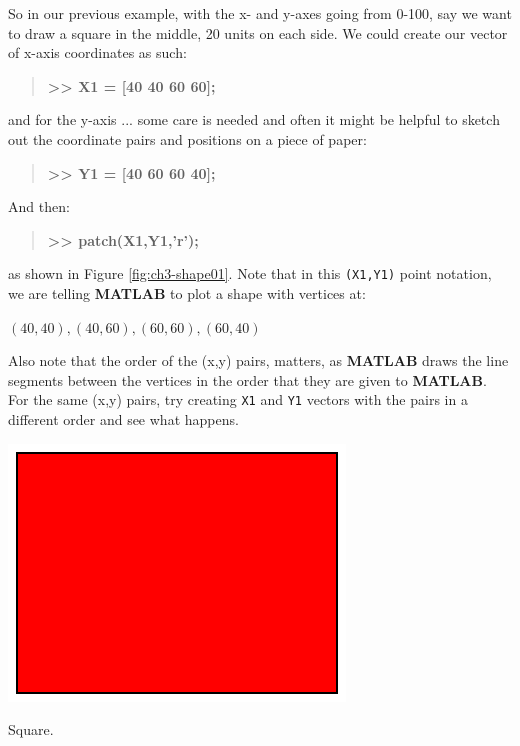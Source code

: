 \documentclass{tufte-book} %
\newenvironment{docspecbold}{\begin{quotation}\ttfamily\bfseries\parskip0pt\parindent0pt\ignorespaces}{\end{quotation}}
\begin{document}
So in our previous example, with the x- and y-axes going from 0-100, say we want to draw a square in the middle, 20 units on each side. We could create our vector of x-axis coordinates as such:
\begin{docspecbold}
>> X1 = [40 40 60 60];
\end{docspecbold}
and for the y-axis ... some care is needed and often it might be helpful to sketch out the coordinate pairs and positions on a piece of paper:
\begin{docspecbold}
>> Y1 = [40 60 60 40];
\end{docspecbold}
And then:
\begin{docspecbold}
>> patch(X1,Y1,'r');
\end{docspecbold}
as shown in Figure \ref{fig:ch3-shape01}. Note that in this \texttt{(X1,Y1)} point notation, we are telling \textbf{MATLAB} to plot a shape with vertices at:

\vspace{2mm}
\((40,40), (40,60), (60,60), (60,40)\)
\vspace{2mm}

\noindent Also note that the order of the (x,y) pairs, matters, as \textbf{MATLAB} draws the line segments between the vertices in the order that they are given to \textbf{MATLAB}. For the same (x,y) pairs, try creating \texttt{X1} and \texttt{Y1} vectors with the pairs in a different order and see what happens.

\begin{marginfigure}[-2.0in]
\includegraphics[width=\linewidth]{ch3-shape01.eps}
\caption{Square.}
\label{fig:ch3-shape01}
\end{marginfigure}
\end{document}
